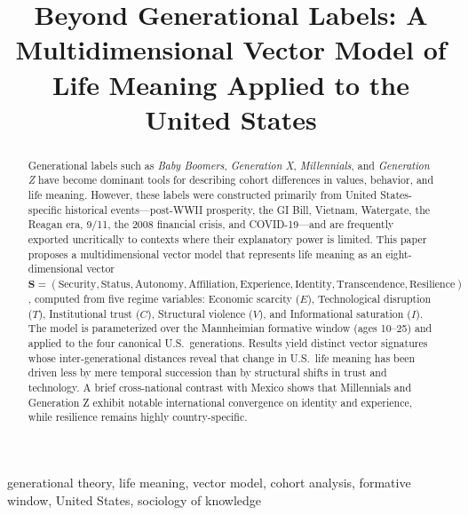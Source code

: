 \documentclass[conference]{IEEEtran}
\begin{document}
\title{Beyond Generational Labels: A Multidimensional Vector Model of Life Meaning Applied to the United States}

\author{
}

\maketitle

\begin{abstract}
Generational labels such as \textit{Baby Boomers}, \textit{Generation X}, \textit{Millennials}, and \textit{Generation Z} have become dominant tools for describing cohort differences in values, behavior, and life meaning. However, these labels were constructed primarily from United States-specific historical events---post-WWII prosperity, the GI Bill, Vietnam, Watergate, the Reagan era, 9/11, the 2008 financial crisis, and COVID-19---and are frequently exported uncritically to contexts where their explanatory power is limited. This paper proposes a multidimensional vector model that represents life meaning as an eight-dimensional vector $\mathbf{S} = (\text{Security}, \text{Status}, \text{Autonomy}, \text{Affiliation}, \text{Experience}, \text{Identity}, \text{Transcendence}, \text{Resilience})$, computed from five regime variables: Economic scarcity ($E$), Technological disruption ($T$), Institutional trust ($C$), Structural violence ($V$), and Informational saturation ($I$). The model is parameterized over the Mannheimian formative window (ages 10--25) and applied to the four canonical U.S.\ generations. Results yield distinct vector signatures whose inter-generational distances reveal that change in U.S.\ life meaning has been driven less by mere temporal succession than by structural shifts in trust and technology. A brief cross-national contrast with Mexico shows that Millennials and Generation Z exhibit notable international convergence on identity and experience, while resilience remains highly country-specific.
\end{abstract}

\begin{IEEEkeywords}
generational theory, life meaning, vector model, cohort analysis, formative window, United States, sociology of knowledge
\end{IEEEkeywords}
\end{document}
